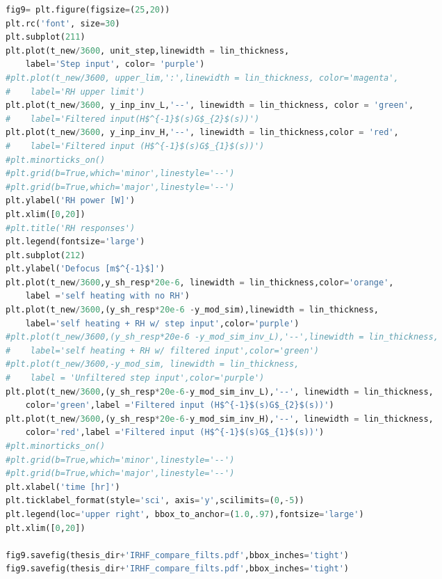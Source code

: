 
\begin{spacing}{1.2} \begin{lstlisting}[frame=single,language=Python]
fig9= plt.figure(figsize=(25,20))
plt.rc('font', size=30)
plt.subplot(211)
plt.plot(t_new/3600, unit_step,linewidth = lin_thickness,
    label='Step input', color= 'purple')
#plt.plot(t_new/3600, upper_lim,':',linewidth = lin_thickness, color='magenta', 
#    label='RH upper limit')
plt.plot(t_new/3600, y_inp_inv_L,'--', linewidth = lin_thickness, color = 'green',
#    label='Filtered input(H$^{-1}$(s)G$_{2}$(s))')
plt.plot(t_new/3600, y_inp_inv_H,'--', linewidth = lin_thickness,color = 'red', 
#    label='Filtered input (H$^{-1}$(s)G$_{1}$(s))')
#plt.minorticks_on()
#plt.grid(b=True,which='minor',linestyle='--')
#plt.grid(b=True,which='major',linestyle='--')
plt.ylabel('RH power [W]')
plt.xlim([0,20])
#plt.title('RH responses')
plt.legend(fontsize='large')
plt.subplot(212)
plt.ylabel('Defocus [m$^{-1}$]')
plt.plot(t_new/3600,y_sh_resp*20e-6, linewidth = lin_thickness,color='orange',
    label ='self heating with no RH')
plt.plot(t_new/3600,(y_sh_resp*20e-6 -y_mod_sim),linewidth = lin_thickness,
    label='self heating + RH w/ step input',color='purple')
#plt.plot(t_new/3600,(y_sh_resp*20e-6 -y_mod_sim_inv_L),'--',linewidth = lin_thickness,
#    label='self heating + RH w/ filtered input',color='green')
#plt.plot(t_new/3600,-y_mod_sim, linewidth = lin_thickness,
#    label = 'Unfiltered step input',color='purple')
plt.plot(t_new/3600,(y_sh_resp*20e-6-y_mod_sim_inv_L),'--', linewidth = lin_thickness,
    color='green',label ='Filtered input (H$^{-1}$(s)G$_{2}$(s))')
plt.plot(t_new/3600,(y_sh_resp*20e-6-y_mod_sim_inv_H),'--', linewidth = lin_thickness,
    color='red',label ='Filtered input (H$^{-1}$(s)G$_{1}$(s))')
#plt.minorticks_on()
#plt.grid(b=True,which='minor',linestyle='--')
#plt.grid(b=True,which='major',linestyle='--')
plt.xlabel('time [hr]')
plt.ticklabel_format(style='sci', axis='y',scilimits=(0,-5))
plt.legend(loc='upper right', bbox_to_anchor=(1.0,.97),fontsize='large')
plt.xlim([0,20])

fig9.savefig(thesis_dir+'IRHF_compare_filts.pdf',bbox_inches='tight')
fig9.savefig(thesis_dir+'IRHF_compare_filts.pdf',bbox_inches='tight')
\end{lstlisting} \end{spacing}

